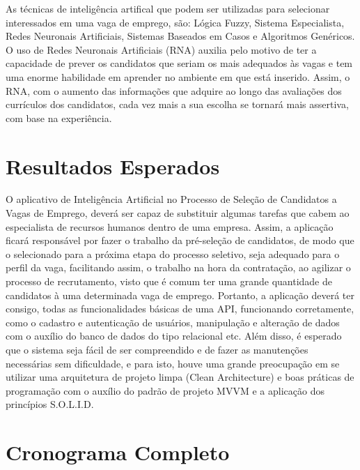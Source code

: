 \documentclass{document}
\begin{document}
    As técnicas de inteligência artifical que podem ser utilizadas para selecionar interessados em uma vaga de emprego, são: Lógica
    Fuzzy, Sistema Especialista, Redes Neuronais Artificiais, Sistemas Baseados em Casos e Algoritmos Genéricos. O uso de Redes Neuronais Artificiais
    (RNA) auxilia pelo motivo de ter a capacidade de prever os candidatos que seriam os mais adequados às vagas e tem uma enorme habilidade
    em aprender no ambiente em que está inserido. Assim, o RNA, com o aumento das informações que adquire ao longo das avaliações dos currículos dos
    candidatos, cada vez mais a sua escolha se tornará mais assertiva, com base na experiência.

    \section{Resultados Esperados}

    O aplicativo de Inteligência Artificial no Processo de Seleção de Candidatos a Vagas de Emprego, deverá ser capaz de substituir algumas 
    tarefas que cabem ao especialista de recursos humanos dentro de uma empresa. Assim, a aplicação ficará responsável por fazer
    o trabalho da pré-seleção de candidatos, de modo que o selecionado para a próxima etapa do processo seletivo, seja adequado para o perfil da 
    vaga, facilitando assim, o trabalho na hora da contratação, ao agilizar o processo de recrutamento, visto que é comum ter uma grande 
    quantidade de candidatos à uma determinada vaga de emprego. Portanto, a aplicação deverá ter consigo, todas as funcionalidades básicas de
    uma API, funcionando corretamente, como o cadastro e autenticação de usuários, manipulação e alteração de dados com o auxílio do banco de
    dados do tipo relacional etc. Além disso, é esperado que o sistema seja fácil de ser compreendido e de fazer as manutenções necessárias sem
    dificuldade, e para isto, houve uma grande preocupação em se utilizar uma arquitetura de projeto limpa (Clean Architecture) e boas práticas 
    de programação com o auxílio do padrão de projeto MVVM e a aplicação dos princípios S.O.L.I.D.

    \section{Cronograma Completo}
\end{document}
